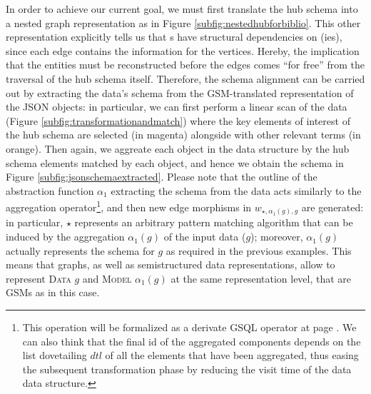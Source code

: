 \begin{example}[continues=ex:examplegraphdata,label=ex:examplereferencedOcaml]
In order to achieve our current goal, we must first translate the hub schema into a nested graph representation as in Figure \vref{subfig:nestedhubforbiblio}. This other representation explicitly tells us that \RELA s have structural dependencies on \ONTA(ies), since each edge contains the information for the vertices. Hereby, the implication that the entities must be reconstructed before the edges comes ``for free'' from the traversal of the hub schema itself. Therefore, the schema alignment can be carried out by extracting the data's schema from the GSM-translated representation of the JSON objects: in particular, we can first perform a linear scan of the data (Figure \vref{subfig:transformationandmatch}) where the key elements of interest of the hub schema are selected (in magenta) alongside with other relevant terms (in orange). Then again, we aggreate each object in the data structure by the hub schema elements matched by each object, and hence we obtain the schema in Figure \ref{subfig:jsonschemaextracted}. Please note that the outline of the abstraction function $\alpha_1$	 extracting the schema from the data acts similarly to the aggregation operator\footnote{This operation will be formalized as a derivate GSQL operator at page \pageref{abstractionAlpha1}. We can also think that the final id of the aggregated components depends on the list dovetailing $dtl$ of all the elements that have been aggregated, thus easing the subsequent transformation phase by reducing the visit time of the data data structure. }, and then new edge morphisms in $w_{\star,\alpha_1(g),g}$ are generated: in particular, $\star$ represents an arbitrary pattern matching algorithm that can be induced by the aggregation $\alpha_1(g)$ of the input data ($g$); moreover, $\alpha_1(g)$ actually represents the schema for $g$ as required in the previous examples.  This means that graphs, as well as semistructured data representations, allow to represent \textsc{Data} $g$ and \textsc{Model} $\alpha_1(g)$ at the same representation level, that are GSMs as in this case.


\end{example}
